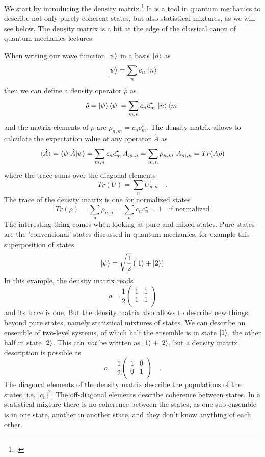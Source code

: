 We start by introducing the density matrix.\footcite{Rand2016,Parson,Hamm-dummies}
It is a tool in quantum mechanics to describe not only purely coherent states, but also statistical mixtures, as we will see below. The density matrix is a bit at the edge of the classical canon of quantum mechanics lectures.

When  writing our wave function $\ket{\psi}$ in  a basis $\ket{n}$ as
\[
 \ket{\psi} = \sum_n c_n \, \ket{n}
\]
then we can define a density operator $\hat{\rho}$ as
\[
\hat{\rho} =  \ket{\psi}\bra{\psi} = \sum_{m,n} c_n c_m^\star \, \ket{n}\bra{m}
\]
and the matrix elements of $\rho$ are $\rho_{n,m} =  c_n c_m^\star$. The density matrix allows to calculate the expectation value of any operator $\hat{A}$ as
\[
 \braket{\hat{A}} =  \braket{\psi | \hat{A} | \psi}  = \sum_{m,n} c_n c_m^\star \, A_{m,n} = \sum_{m,n} \rho_{n,m} \,  \, A_{m,n} = Tr ( A \rho)
\]
where the trace sums over the diagonal elements
\[
 Tr (U ) = \sum_n U_{n,n}  \quad .
\]
The trace of the density matrix is one for normalized states 
\[
 Tr (\rho) = \sum_n \rho_{n,n} = \sum_n c_n c_n^\star = 1 \quad \text{if normalized}
\]
The interesting thing comes when looking at pure and mixed states. Pure states are the 'conventional' states discussed in quantum mechanics, for example this superposition of states
\[
\ket{\psi} = \sqrt{\frac{1}{2}} \left( \ket{1} + \ket{2} \right) 
\]
In this example, the density matrix reads
\[
 \rho = \frac{1}{2} \begin{pmatrix}
 1 & 1 \\ 1 & 1 \\
 \end{pmatrix}
\]
and its trace is one. But the density matrix also allows to describe new things, beyond pure states, namely statistical mixtures of states. We can describe an ensemble of two-level systems, of which half the ensemble is in state $\ket{1}$, the other half in state $\ket{2}$. This can \emph{not} be written as 
$\ket{1} + \ket{2} $, but a density matrix description is possible as
\[
 \rho = \frac{1}{2} \begin{pmatrix}
 1 & 0 \\ 0 & 1 \\
 \end{pmatrix} \quad .
\]
The diagonal elements of the density matrix describe the populations of the states, i.e. $|c_n|^2$. The off-diagonal elements describe coherence between states. In a statistical mixture there is no coherence between the states, as one sub-ensemble is in one state, another in another state, and they don't know anything of each other.

